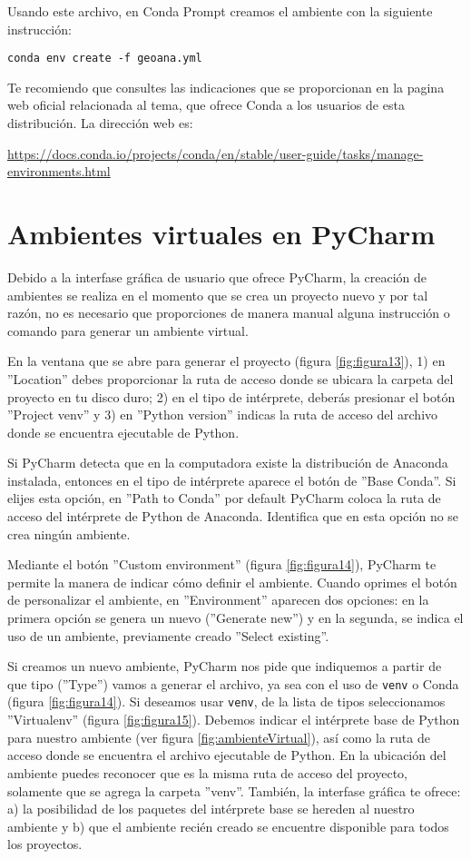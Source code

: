 Usando este archivo, en Conda Prompt creamos el ambiente con la siguiente instrucción:
\begin{verbatim}
conda env create -f geoana.yml
\end{verbatim}
	
Te recomiendo que consultes las indicaciones que se proporcionan en la pagina web oficial relacionada al tema, que ofrece Conda a los usuarios de esta distribución. La dirección web es:\bigskip
	
\url{https://docs.conda.io/projects/conda/en/stable/user-guide/tasks/manage-environments.html}
	
\section{Ambientes virtuales en PyCharm}
Debido a la interfase gráfica de usuario que ofrece PyCharm, la creación de ambientes se realiza en el momento que se crea un proyecto nuevo y por tal razón, no es necesario que proporciones de manera manual alguna instrucción o comando para generar un ambiente virtual.\bigskip
	
En la ventana que se abre para generar el proyecto (figura \ref{fig:figura13}), 1) en ''Location'' debes proporcionar la ruta de acceso donde se ubicara la carpeta del proyecto en tu disco duro; 2) en el tipo de intérprete, deberás presionar el botón ''Project venv'' y 3) en ''Python version'' indicas la ruta de acceso del archivo donde se encuentra ejecutable de Python.\bigskip
	
Si PyCharm detecta que en la computadora existe la distribución de Anaconda instalada, entonces en el tipo de intérprete aparece el botón de ''Base Conda''. Si elijes esta opción, en ''Path to Conda'' por default PyCharm coloca la ruta de acceso del intérprete de Python de Anaconda. Identifica que en esta opción no se crea ningún ambiente.\bigskip 
	
Mediante el botón ''Custom environment'' (figura \ref{fig:figura14}), PyCharm te permite la manera de indicar cómo definir el ambiente. Cuando oprimes el botón de personalizar el ambiente, en ''Environment'' aparecen dos opciones: en la primera opción se genera un nuevo (''Generate new'') y en la segunda, se indica el uso de un ambiente, previamente creado ''Select existing''. \bigskip
	
Si creamos un nuevo ambiente, PyCharm nos pide que indiquemos a partir de que tipo (''Type'') vamos a generar el archivo, ya sea con el uso de \texttt{venv} o Conda (figura \ref{fig:figura14}). Si deseamos usar \texttt{venv}, de la lista de tipos seleccionamos ''Virtualenv'' (figura \ref{fig:figura15}). Debemos indicar el intérprete base de Python para nuestro ambiente (ver figura \ref{fig:ambienteVirtual}), así como la ruta de acceso donde se encuentra el archivo ejecutable de Python. En la ubicación del ambiente puedes reconocer que es la misma ruta de acceso del proyecto, solamente que se agrega la carpeta ''venv''. También, la interfase gráfica te ofrece: a) la posibilidad de los paquetes del intérprete base se hereden al nuestro ambiente y b) que el ambiente recién creado se encuentre disponible para todos los proyectos.
	
